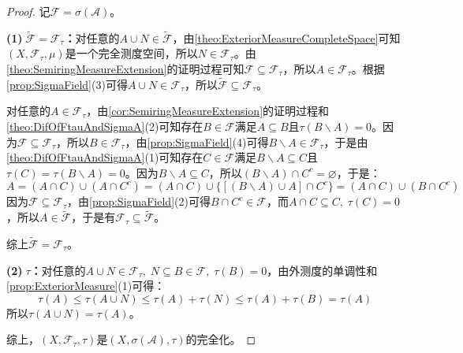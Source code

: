 \begin{proof}
	记$\mathscr{F}=\sigma(\mathscr{A})$。\par
	\textbf{(1)$\;\tilde{\mathscr{F}}=\mathscr{F}_\tau$：}对任意的$A\cup N\in\tilde{\mathscr{F}}$，由\cref{theo:ExteriorMeasureCompleteSpace}可知$(X,\mathscr{F}_\tau,\mu)$是一个完全测度空间，所以$N\in\mathscr{F}_\tau$。由\cref{theo:SemiringMeasureExtension}的证明过程可知$\mathscr{F}\subseteq\mathscr{F}_\tau$，所以$A\in\mathscr{F}_\tau$。根据\cref{prop:SigmaField}(3)可得$A\cup N\in\mathscr{F}_\tau$，所以$\tilde{\mathscr{F}}\subseteq\mathscr{F}_\tau$。\par
	对任意的$A\in\mathscr{F}_\tau$，由\cref{cor:SemiringMeasureExtension}的证明过程和\cref{theo:DifOfFtauAndSigmaA}(2)可知存在$B\in\mathscr{F}$满足$A\subseteq B$且$\tau(B\backslash A)=0$。因为$\mathscr{F}\subseteq\mathscr{F}_\tau$，所以$B\in\mathscr{F}_\tau$，由\cref{prop:SigmaField}(4)可得$B\backslash A\in\mathscr{F}_\tau$，于是由\cref{theo:DifOfFtauAndSigmaA}(1)可知存在$C\in\mathscr{F}$满足$B\backslash A\subseteq C$且$\tau(C)=\tau(B\backslash A)=0$。因为$B\backslash A\subseteq C$，所以$(B\backslash A)\cap C^c=\varnothing$，于是：
	\begin{equation*}
		A=(A\cap C)\cup(A\cap C^c)=(A\cap C)\cup\{[(B\backslash A)\cup A]\cap C^c\}=(A\cap C)\cup(B\cap C^c)
	\end{equation*}
	因为$\mathscr{F}\subseteq\mathscr{F}_\tau$，由\cref{prop:SigmaField}(2)可得$B\cap C^c\in\mathscr{F}$，而$A\cap C\subseteq C,\;\tau(C)=0$，所以$A\in\tilde{\mathscr{F}}$，于是有$\mathscr{F}_\tau\subseteq\tilde{\mathscr{F}}$。\par
	综上$\tilde{\mathscr{F}}=\mathscr{F}_\tau$。\par
	\textbf{(2)$\;\tau$：}对任意的$A\cup N\in\mathscr{F}_\tau,\;N\subseteq B\in\mathscr{F},\;\tau(B)=0$，由外测度的单调性和\cref{prop:ExteriorMeasure}(1)可得：
	\begin{equation*}
		\tau(A)\leqslant\tau(A\cup N)\leqslant\tau(A)+\tau(N)\leqslant\tau(A)+\tau(B)=\tau(A)
	\end{equation*}
	所以$\tau(A\cup N)=\tau(A)$。\par
	综上，$(X,\mathscr{F}_\tau,\tau)$是$(X,\sigma(\mathscr{A}),\tau)$的完全化。
\end{proof}